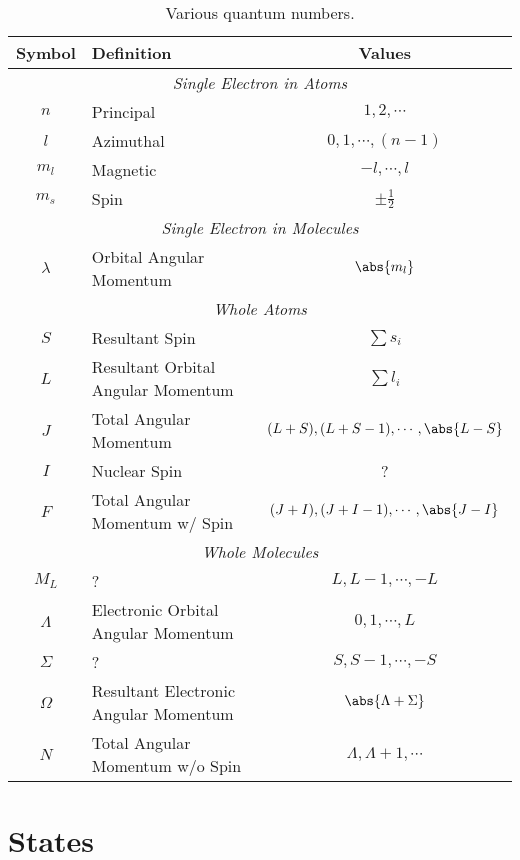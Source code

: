 \documentclass[11pt, twoside, fleqn]{report}
\begin{document}
\begin{table}[H]
    \centering
    \caption{Various quantum numbers.}
    \label{t:quantum_numbers}
    \begin{tabular}{clc}
        \toprule
        Symbol & Definition & Values \\
        \midrule
        \multicolumn{3}{c}{\textit{Single Electron in Atoms}} \\
        \cmidrule(lr){1-3}
        $n$ & Principal & $1, 2, \dotsb$ \\
        $l$ & Azimuthal & $0, 1, \dotsb, (n - 1)$ \\
        $m_l$ & Magnetic & $-l, \dotsb, l$ \\
        $m_s$ & Spin & $\pm \frac{1}{2}$ \\
        \multicolumn{3}{c}{\textit{Single Electron in Molecules}} \\
        \cmidrule(lr){1-3}
        $\lambda$ & Orbital Angular Momentum & $\abs{m_l}$ \\
        \multicolumn{3}{c}{\textit{Whole Atoms}} \\
        \cmidrule(lr){1-3}
        $S$ & Resultant Spin & $\sum s_i$ \\
        $L$ & Resultant Orbital Angular Momentum & $\sum l_i$ \\
        $J$ & Total Angular Momentum & $(L + S), (L + S - 1), \dotsb, \abs{L - S}$ \\
        $I$ & Nuclear Spin & ? \\
        $F$ & Total Angular Momentum w/ Spin & $(J + I), (J + I - 1), \dotsb, \abs{J - I}$ \\
        \multicolumn{3}{c}{\textit{Whole Molecules}} \\
        \cmidrule(lr){1-3}
        $M_L$ & ? & $L, L - 1, \dotsb, -L$ \\
        $\Lambda$ & Electronic Orbital Angular Momentum & $0, 1, \dotsb, L$ \\
        $\Sigma$ & ? & $S, S - 1, \dotsb, -S$ \\
        $\Omega$ & Resultant Electronic Angular Momentum & $\abs{\Lambda + \Sigma}$ \\
        $N$ & Total Angular Momentum w/o Spin & $\Lambda, \Lambda + 1, \dotsb$ \\
        \bottomrule
    \end{tabular}
\end{table}

\chapter{States}
\label{a:states}
\end{document}
